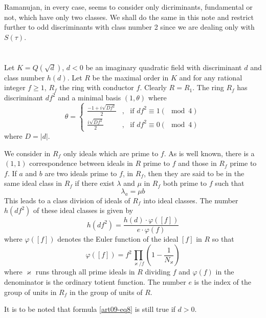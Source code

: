 Ramanujan, in every case, seems to consider only dicriminants, fundamental or not, which have only two classes. We shall do the same in this note and restrict further to odd discriminants with class number 2 since we are dealing only with $S(\tau)$.

\section{}\label{art09-sec2}
Let $K=Q(\sqrt{d})$, $d<0$ be an imaginary quadratic field with discriminant $d$ and class number $h(d)$. Let $R$ be the maximal order in $K$ and for any rational integer $f\geq 1$, $R_{f}$ the ring with conductor $f$. Clearly $R=R_{1}$. The ring $R_{f}$ has discriminant $df^{2}$ and a minimal basis $(1,\theta)$ where 
\begin{equation}
\theta = 
\begin{cases}
\frac{-1+i\sqrt{Df^{2}}}{2} &, \text{~ if } df^{2}\equiv 1(\mod 4)\\[4pt]
\frac{i\sqrt{Df^{2}}}{2}    &, \text{~ if } df^{2}\equiv 0(\mod 4)
\end{cases}\label{art09-eq7}
\end{equation}\pageoriginale
where $D=|d|$.

We consider in $R_{f}$ only ideals which are prime to $f$. As is well known, there is a $(1,1)$ correspondence between ideals in $R$ prime to $f$ and those in $R_{f}$ prime to $f$. If $a$ and $b$ are two ideals prime to $f$, in $R_{f}$, then they are said to be in the same ideal class in $R_{f}$ if there exist $\lambda$ and $\mu$ in $R_{f}$ both prime to $f$ such that
$$
\lambda_{a}=\mu b
$$
This leads to a class division of ideals of $R_{f}$ into ideal classes. The number $h(df^{2})$ of these ideal classes is given by
\begin{equation}
h(df^{2})=\frac{h(d)\cdot \varphi([f])}{e\cdot \varphi(f)}\label{art09-eq8}
\end{equation}
where $\varphi([f])$ denotes the Euler function of the ideal $[f]$ in $R$ so that
\begin{equation}
\varphi([f])=f^{2}\prod\limits_{\varkappa/f}(1-\frac{1}{N_{\varkappa}})
\end{equation}
where $\varkappa$ runs through all prime ideals in $R$ dividing $f$ and $\varphi(f)$ in the denominator is the ordinary totient function. The number $e$ is the index of the group of units in $R_{f}$ in the group of units of $R$.

It is to be noted that formula \eqref{art09-eq8} is still true if $d>0$.

